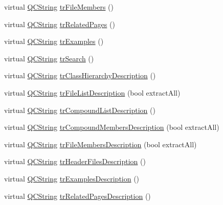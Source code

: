 \begin{DoxyCompactItemize}
\item 
virtual \mbox{\hyperlink{class_q_c_string}{Q\+C\+String}} \mbox{\hyperlink{class_translator_norwegian_a32c4b846f22c62e2813f5c481fd19833}{tr\+File\+Members}} ()
\item 
virtual \mbox{\hyperlink{class_q_c_string}{Q\+C\+String}} \mbox{\hyperlink{class_translator_norwegian_a7cfa9bfcbfb2ab088ae4cfd8d8e57060}{tr\+Related\+Pages}} ()
\item 
virtual \mbox{\hyperlink{class_q_c_string}{Q\+C\+String}} \mbox{\hyperlink{class_translator_norwegian_a809b1833c57839084661bf3e075a43b3}{tr\+Examples}} ()
\item 
virtual \mbox{\hyperlink{class_q_c_string}{Q\+C\+String}} \mbox{\hyperlink{class_translator_norwegian_a7cee2d49aedfd0694f2a8bf96bc49b85}{tr\+Search}} ()
\item 
virtual \mbox{\hyperlink{class_q_c_string}{Q\+C\+String}} \mbox{\hyperlink{class_translator_norwegian_aeaf48ca1671fc1d9877389cdbfffebc6}{tr\+Class\+Hierarchy\+Description}} ()
\item 
virtual \mbox{\hyperlink{class_q_c_string}{Q\+C\+String}} \mbox{\hyperlink{class_translator_norwegian_a4fd299e2c38cf34ed514bb3de01aeaf0}{tr\+File\+List\+Description}} (bool extract\+All)
\item 
virtual \mbox{\hyperlink{class_q_c_string}{Q\+C\+String}} \mbox{\hyperlink{class_translator_norwegian_a0a70da831e02253a3fd30d785b1a77c2}{tr\+Compound\+List\+Description}} ()
\item 
virtual \mbox{\hyperlink{class_q_c_string}{Q\+C\+String}} \mbox{\hyperlink{class_translator_norwegian_a409423af24454ffed30d2aeab812a9b3}{tr\+Compound\+Members\+Description}} (bool extract\+All)
\item 
virtual \mbox{\hyperlink{class_q_c_string}{Q\+C\+String}} \mbox{\hyperlink{class_translator_norwegian_ae9fe7a382e392c785e94232bb507f9f6}{tr\+File\+Members\+Description}} (bool extract\+All)
\item 
virtual \mbox{\hyperlink{class_q_c_string}{Q\+C\+String}} \mbox{\hyperlink{class_translator_norwegian_a02d20eaf0e7a21c70f63b89960167130}{tr\+Header\+Files\+Description}} ()
\item 
virtual \mbox{\hyperlink{class_q_c_string}{Q\+C\+String}} \mbox{\hyperlink{class_translator_norwegian_a3b1e3c1b1bb2c424f52898d3a7317e4f}{tr\+Examples\+Description}} ()
\item 
virtual \mbox{\hyperlink{class_q_c_string}{Q\+C\+String}} \mbox{\hyperlink{class_translator_norwegian_a0bb96adb596a9b6c878033df8b6e270b}{tr\+Related\+Pages\+Description}} ()

\end{DoxyCompactItemize}
